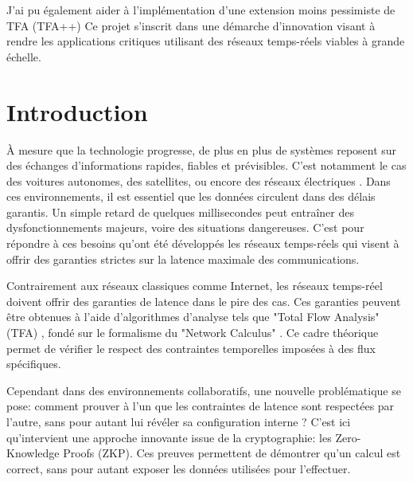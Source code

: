 \documentclass[12pt]{report}
\begin{document}
\vspace{0.2cm}

J'ai pu également aider à l'implémentation d'une extension moins pessimiste de TFA (TFA++)
Ce projet s'inscrit dans une démarche d'innovation visant à rendre 
les applications critiques utilisant des réseaux temps-réels viables à
grande échelle.


\tableofcontents
\newpage

\chapter{Introduction}
\setcounter{page}{1}

À mesure que la technologie progresse, de plus en plus de systèmes 
reposent sur des échanges d'informations rapides, fiables et 
prévisibles. C'est notamment le cas des voitures autonomes,
des satellites, ou encore des réseaux électriques \cite{docquierMethodologiesPourLevaluation2021} \cite{docquierDeterminingTightWorstcase2020}. Dans ces environnements, il est essentiel que 
les données circulent dans des 
délais garantis. Un simple retard de quelques millisecondes peut entraîner 
des dysfonctionnements majeurs, voire des situations dangereuses. 
C'est pour répondre à ces besoins qu'ont été développés les réseaux 
temps-réels qui visent à offrir des garanties strictes sur la latence 
maximale des communications.

\bigskip

Contrairement aux réseaux classiques comme Internet, les réseaux temps-réel doivent offrir des garanties de latence dans le pire des cas.
Ces garanties peuvent être obtenues à l'aide d'algorithmes d'analyse tels que "Total Flow Analysis" (TFA) \cite{10.1145/1190095.1190105}, fondé sur le formalisme du "Network Calculus" \cite{leboudec2001network}.
Ce cadre théorique permet de vérifier le respect des contraintes temporelles imposées à des flux spécifiques.

\bigskip

Cependant dans des environnements collaboratifs, une nouvelle problématique 
se pose: comment prouver à l'un que les contraintes de latence sont 
respectées par l'autre, sans pour autant lui révéler sa configuration interne ? 
C'est ici qu'intervient une approche innovante issue de la cryptographie: les Zero-Knowledge Proofs 
(ZKP). Ces preuves permettent de démontrer qu'un calcul est correct, 
sans pour autant exposer les données utilisées pour l'effectuer.
\end{document}
